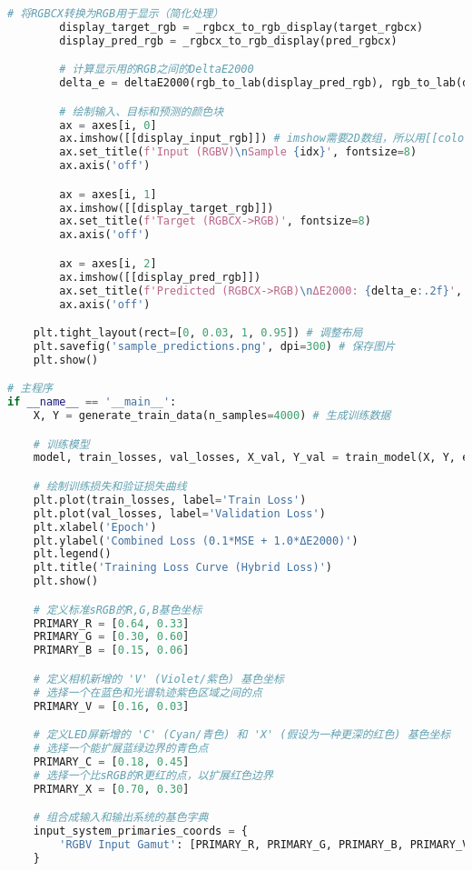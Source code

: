 \begin{lstlisting}[language=Python]
        # 将RGBCX转换为RGB用于显示（简化处理）
        display_target_rgb = _rgbcx_to_rgb_display(target_rgbcx)
        display_pred_rgb = _rgbcx_to_rgb_display(pred_rgbcx)

        # 计算显示用的RGB之间的DeltaE2000
        delta_e = deltaE2000(rgb_to_lab(display_pred_rgb), rgb_to_lab(display_target_rgb))

        # 绘制输入、目标和预测的颜色块
        ax = axes[i, 0]
        ax.imshow([[display_input_rgb]]) # imshow需要2D数组，所以用[[color]]
        ax.set_title(f'Input (RGBV)\nSample {idx}', fontsize=8)
        ax.axis('off')

        ax = axes[i, 1]
        ax.imshow([[display_target_rgb]])
        ax.set_title(f'Target (RGBCX->RGB)', fontsize=8)
        ax.axis('off')

        ax = axes[i, 2]
        ax.imshow([[display_pred_rgb]])
        ax.set_title(f'Predicted (RGBCX->RGB)\nΔE2000: {delta_e:.2f}', fontsize=8)
        ax.axis('off')

    plt.tight_layout(rect=[0, 0.03, 1, 0.95]) # 调整布局
    plt.savefig('sample_predictions.png', dpi=300) # 保存图片
    plt.show()

# 主程序
if __name__ == '__main__':
    X, Y = generate_train_data(n_samples=4000) # 生成训练数据

    # 训练模型
    model, train_losses, val_losses, X_val, Y_val = train_model(X, Y, epochs=200, lr=5e-4)

    # 绘制训练损失和验证损失曲线
    plt.plot(train_losses, label='Train Loss')
    plt.plot(val_losses, label='Validation Loss')
    plt.xlabel('Epoch')
    plt.ylabel('Combined Loss (0.1*MSE + 1.0*ΔE2000)')
    plt.legend()
    plt.title('Training Loss Curve (Hybrid Loss)')
    plt.show()

    # 定义标准sRGB的R,G,B基色坐标
    PRIMARY_R = [0.64, 0.33]
    PRIMARY_G = [0.30, 0.60]
    PRIMARY_B = [0.15, 0.06]

    # 定义相机新增的 'V' (Violet/紫色) 基色坐标
    # 选择一个在蓝色和光谱轨迹紫色区域之间的点
    PRIMARY_V = [0.16, 0.03]

    # 定义LED屏新增的 'C' (Cyan/青色) 和 'X' (假设为一种更深的红色) 基色坐标
    # 选择一个能扩展蓝绿边界的青色点
    PRIMARY_C = [0.18, 0.45]
    # 选择一个比sRGB的R更红的点，以扩展红色边界
    PRIMARY_X = [0.70, 0.30]

    # 组合成输入和输出系统的基色字典
    input_system_primaries_coords = {
        'RGBV Input Gamut': [PRIMARY_R, PRIMARY_G, PRIMARY_B, PRIMARY_V]
    }


\end{lstlisting}
